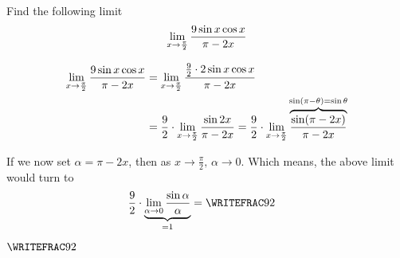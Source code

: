


\question[3] Find the following limit \[\lim_{x\to\frac{\pi}{2}}\dfrac{9 \sin x\cos x}{\pi - 2x}\]

\watchout[-40pt]

\begin{solution}[\halfpage]
  \begin{align}
    \lim_{x\to\frac{\pi}{2}}\dfrac{9 \sin x\cos x}{\pi - 2x} &=
    \lim_{x\to\frac{\pi}{2}}\dfrac{\frac{9}{2}\cdot 2\sin x\cos x}{\pi - 2x} \\
    &= \dfrac{9}{2}\cdot\lim_{x\to\frac{\pi}{2}}\dfrac{\sin 2x}{\pi-2x} =
    \dfrac{9}{2}\cdot\lim_{x\to\frac{\pi}{2}}\overbrace{\dfrac{\sin (\pi-2x)}{\pi-2x}}^{\sin(\pi-\theta) = \sin\theta}
  \end{align}
  
  If we now set $\alpha = \pi - 2x$, then as $x\to\frac\pi{2},\, \alpha\to 0$. Which means, 
  the above limit would turn to 
  \begin{align}
    &\dfrac{\va}{2}\cdot\underbrace{\lim_{\alpha\to 0}\dfrac{\sin\alpha}{\alpha}}
    _{= 1} = \WRITEFRAC\va{2}
  \end{align}
\end{solution}
\ifprintanswers\begin{codex}$\WRITEFRAC\va{2}$\end{codex}\fi

